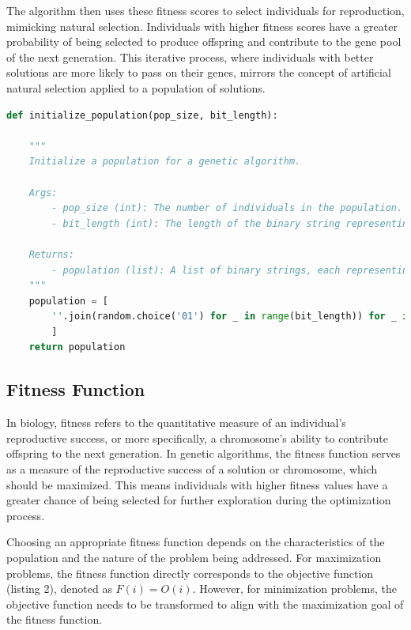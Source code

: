 \documentclass[12pt]{article}
\begin{document}
The algorithm then uses these fitness scores to select individuals for reproduction, mimicking natural selection. Individuals with higher fitness scores have a greater probability of being selected to produce offspring and contribute to the gene pool of the next generation. This iterative process, where individuals with better solutions are more likely to pass on their genes, mirrors the concept of artificial natural selection applied to a population of solutions.



\begin{lstlisting}[language=Python, caption={Initialize a population for a genetic algorithm}, numbers=none, breaklines=true]
def initialize_population(pop_size, bit_length):

    """
    Initialize a population for a genetic algorithm.

    Args:
        - pop_size (int): The number of individuals in the population.
        - bit_length (int): The length of the binary string representing each individual.

    Returns:
        - population (list): A list of binary strings, each representing an individual in the population.
    """
    population = [
        ''.join(random.choice('01') for _ in range(bit_length)) for _ in range(pop_size)
        ]    
    return population  
\end{lstlisting}


\subsection{Fitness Function}

In biology, fitness refers to the quantitative measure of an individual's reproductive success, or more specifically, a chromosome's ability to contribute offspring to the next generation. In genetic algorithms, the fitness function serves as a measure of the reproductive success of a solution or chromosome, which should be maximized. This means individuals with higher fitness values have a greater chance of being selected for further exploration during the optimization process.

Choosing an appropriate fitness function depends on the characteristics of the population and the nature of the problem being addressed. For maximization problems, the fitness function directly corresponds to the objective function (listing 2), denoted as ${F(i) = O(i)}$. However, for minimization problems, the objective function needs to be transformed to align with the maximization goal of the fitness function.
\end{document}
